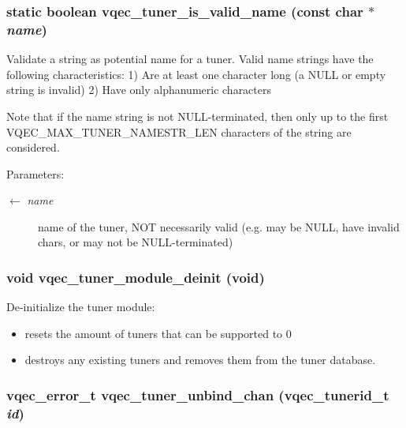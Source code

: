 \subsubsection{\setlength{\rightskip}{0pt plus 5cm}static boolean vqec\_\-tuner\_\-is\_\-valid\_\-name (const char $\ast$ {\em name})\hspace{0.3cm}{\tt  [static]}}\label{vqec__tuner_8c_f6b75f122f70e37c3b71888201d328ea}


Validate a string as potential name for a tuner. Valid name strings have the following characteristics: 1) Are at least one character long (a NULL or empty string is invalid) 2) Have only alphanumeric characters

Note that if the name string is not NULL-terminated, then only up to the first VQEC\_\-MAX\_\-TUNER\_\-NAMESTR\_\-LEN characters of the string are considered.

\begin{Desc}
\item[Parameters:]
\begin{description}
\item[\mbox{$\leftarrow$} {\em name}]name of the tuner, NOT necessarily valid (e.g. may be NULL, have invalid chars, or may not be NULL-terminated) \end{description}
\end{Desc}
\subsubsection{\setlength{\rightskip}{0pt plus 5cm}void vqec\_\-tuner\_\-module\_\-deinit (void)}\label{vqec__tuner_8c_f557c20fa23f544bc59b651472fafbb0}


De-initialize the tuner module:\begin{itemize}
\item resets the amount of tuners that can be supported to 0\item destroys any existing tuners and removes them from the tuner database. \end{itemize}
\subsubsection{\setlength{\rightskip}{0pt plus 5cm}vqec\_\-error\_\-t vqec\_\-tuner\_\-unbind\_\-chan (vqec\_\-tunerid\_\-t {\em id})}\label{vqec__tuner_8c_9d115c328b5683c645bcdd30f3224085}


